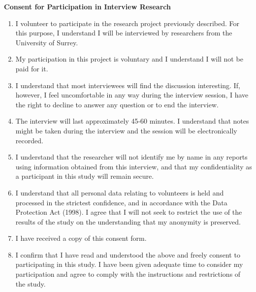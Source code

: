 \newpage
\hrulefill\par

\begin{center}
\textbf{Consent for Participation in Interview Research}
\end{center}

\begin{enumerate}
	\item I volunteer to participate in the research project previously described. For this purpose, I understand I will be interviewed by researchers from the University of Surrey. 
	\item My participation in this project is voluntary and I understand I will not be paid for it.
	\item I understand that most interviewees will find the discussion interesting. If, however, I feel uncomfortable in any way during the interview session, I have the right to decline to answer any question or to end the interview.
	\item The interview will last approximately 45-60 minutes. I understand that notes might be taken during the interview and the session will be electronically recorded.
	\item I understand that the researcher will not identify me by name in any reports using information obtained from this interview, and that my confidentiality as a participant in this study will remain secure.
	\item I understand that all personal data relating to volunteers is held and processed in the strictest confidence, and in accordance with the Data Protection Act (1998). I agree that I will not seek to restrict the use of the results of the study on the understanding that my anonymity is preserved.
	\item I have received a copy of this consent form.
	\item I confirm that I have read and understood the above and freely consent to participating in this study. I have been given adequate time to consider my participation and agree to comply with the instructions and restrictions of the study.
\end{enumerate}

\vspace{.6in}
\vspace{.6in}
